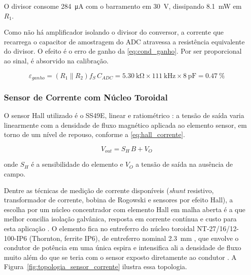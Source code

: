 O divisor consome \SI{284}{\micro\ampere} com o
barramento em \SI{30}{\volt}, dissipando \SI{8,1}{\milli\watt} em $R_1$.

Como não há amplificador isolando o divisor do conversor, a corrente que
recarrega o capacitor de amostragem do ADC atravessa a resistência equivalente
do divisor. O efeito é o erro de ganho da \autoref{eq:cond_ganho}. Por ser
proporcional ao sinal, é absorvido na calibração.

\begin{equation}
\varepsilon_{ganho} = \left(R_1 \parallel R_2\right) f_S\,C_{ADC}
= \SI{5,30}{\kilo\ohm} \times \SI{111}{\kilo\hertz} \times \SI{8}{\pico\farad}
= \SI{0,47}{\percent}
\label{eq:cond_ganho}
\end{equation}


\subsubsection{Sensor de Corrente com Núcleo Toroidal}
\label{sec:same_sensor_corrente}

O sensor Hall utilizado é o SS49E, linear e ratiométrico
\cite{ramsden2006}: a tensão de saída varia linearmente com a densidade de
fluxo magnético aplicada ao elemento sensor, em torno de um nível de
repouso, conforme a \autoref{eq:hall_corrente}.

\begin{equation}
V_{out} = S_H\,B + V_O
\label{eq:hall_corrente}
\end{equation}

\noindent
onde $S_H$ é a sensibilidade do elemento e $V_O$ a tensão de saída na
ausência de campo.

Dentre as técnicas de medição de corrente disponíveis (\textit{shunt}
resistivo, transformador de corrente, bobina de Rogowski e sensores por
efeito Hall), a escolha por um núcleo concentrador com elemento Hall em
malha aberta é a que melhor concilia isolação galvânica, resposta em
corrente contínua e custo para esta aplicação \cite{ziegler2009}. O
elemento fica no entreferro do núcleo toroidal NT-27/16/12-100-IP6
(Thornton, ferrite IP6), de entreferro nominal \SI{2,3}{\milli\meter}
\cite{thornton_nucleos}, que envolve o
condutor de potência em uma única espira e intensifica ali a densidade de
fluxo muito além do que se teria com o sensor exposto diretamente ao
condutor \cite{mclyman2011}. A Figura~\ref{fig:topologia_sensor_corrente}
ilustra essa topologia.

